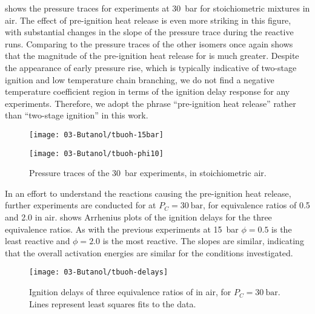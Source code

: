 \documentclass[12pt, letterpaper]{article}
\begin{document}
 shows the pressure traces for \tBuOH{}
experiments at \SI{30}{\bar} for stoichiometric mixtures in air. The effect of
pre-ignition heat release is even more striking in this figure, with
substantial changes in the slope of the pressure trace during the reactive
runs. Comparing to the pressure traces of the other isomers once again shows
that the magnitude of the pre-ignition heat release for \tBuOH{} is
much greater. Despite the appearance of early pressure rise, which is typically
indicative of two-stage ignition and low temperature chain branching, we do not
find a negative temperature coefficient region in terms of the ignition delay
response for any \tBuOH{} experiments. Therefore, we adopt the phrase
``pre-ignition heat release'' rather than ``two-stage ignition'' in this work.

\begin{figure}
    \begin{floatrow}
    \ffigbox
        {\texttt{[image: 03-Butanol/tbuoh-15bar]}}
        {\caption{Pressure traces of the \SI{15}{\bar} \tBuOH{} experiments,
            in stoichiometric air.}
        \label{fig:tbuoh-15bar}}
    \ffigbox
        {\texttt{[image: 03-Butanol/tbuoh-phi10]}}
        {\caption{Pressure traces of the \SI{30}{\bar} \tBuOH{} experiments,
            in stoichiometric air.}
        \label{fig:tbuoh-phi10}}
    \end{floatrow}
\end{figure}

In an effort to understand the reactions causing the pre-ignition heat release,
further experiments are conducted for \tBuOH{} at $P_C=\SI{30}{\bar}$, for
equivalence ratios of 0.5 and 2.0 in air.  shows
Arrhenius plots of the ignition delays for the three equivalence ratios. As
with the previous \nBuOH{} experiments at \SI{15}{\bar} \cite{Weber2011}
$\phi=\num{0.5}$ is the least reactive and $\phi=\num{2.0}$ is the most reactive. The
slopes are similar, indicating that the overall activation energies are similar
for the conditions investigated.

\begin{figure}
    \texttt{[image: 03-Butanol/tbuoh-delays]}
    \caption{Ignition delays of three equivalence ratios of \tBuOH{}
    in air, for $P_C=\SI{30}{\bar}$. Lines represent least squares fits to the data.}
    \label{fig:tbuoh-delays}
\end{figure}
\end{document}

